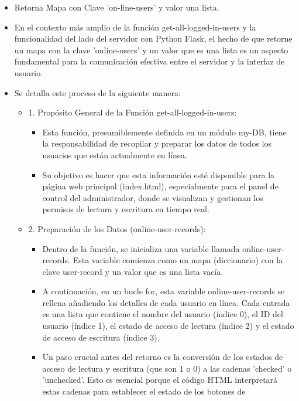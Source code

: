 \documentclass{report}
\begin{document}
\begin{itemize}
    \item Retorna Mapa con Clave 'on-line-users' y valor una lista.
    \item En el contexto más amplio de la función get-all-logged-in-users y la funcionalidad del lado del servidor con Python Flask, el hecho de que 
    retorne un mapa con la clave 'online-users' y un valor que es una lista es un aspecto fundamental para la comunicación efectiva entre el servidor y 
    la interfaz de usuario.
    \item Se detalla este proceso de la siguiente manera:
        \begin{itemize}
            \item 1. Propósito General de la Función get-all-logged-in-users:
                \begin{itemize}
                    \item Esta función, presumiblemente definida en un módulo my-DB, tiene la responsabilidad de recopilar y preparar los datos de 
                    todos los usuarios que están actualmente en línea.
                    \item Su objetivo es hacer que esta información esté disponible para la página web principal (index.html), especialmente para 
                    el panel de control del administrador, donde se visualizan y gestionan los permisos de lectura y escritura en tiempo real.            
                \end{itemize}
            \item 2. Preparación de los Datos (online-user-records):
                \begin{itemize}
                    \item Dentro de la función, se inicializa una variable llamada online-user-records. Esta variable comienza como un mapa (diccionario) con 
                    la clave user-record y un valor que es una lista vacía.
                    \item A continuación, en un bucle for, esta variable online-user-records se rellena añadiendo los detalles de cada usuario en línea. Cada 
                    entrada es una lista que contiene el nombre del usuario (índice 0), el ID del usuario (índice 1), el estado de acceso de lectura (índice 2) 
                    y el estado de acceso de escritura (índice 3).
                    \item Un paso crucial antes del retorno es la conversión de los estados de acceso de lectura y escritura (que son 1 o 0) a las cadenas 
                    'checked' o 'unchecked'. Esto es esencial porque el código HTML interpretará estas cadenas para establecer el estado de los botones de 

\end{itemize}
\end{itemize}
\end{itemize}
\end{document}
